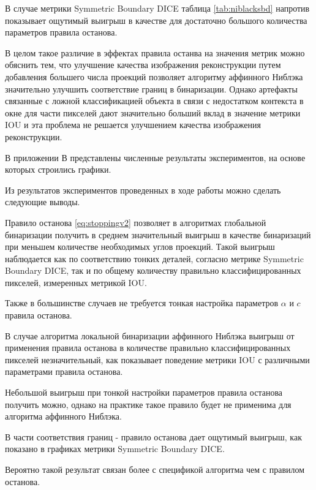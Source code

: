 В случае метрики Symmetric Boundary DICE таблица \ref*{tab:niblacksbd} напротив показывает ощутимый выигрыш в качестве для достаточно большого количества параметров правила останова.

В целом такое различие в эффектах правила останва на значения метрик можно обяснить тем, что улучшение качества изображения реконструкции путем добавления большего числа проекций позволяет алгоритму аффинного Ниблэка значительно улучшить соответствие границ в бинаризации. Однако артефакты связанные с ложной классификацией объекта в связи с недостатком контекста в окне для части пикселей дают значительно больший вклад в значение метрики IOU и эта проблема не решается улучшением качества изображения реконструкции.

В приложении В представлены численные результаты экспериментов, на основе которых строились графики.

Из результатов экспериментов проведенных в ходе работы можно сделать следующие выводы.

Правило останова \ref*{eq:stoppingv2} позволяет в алгоритмах глобальной бинаризации получить в среднем значительный выигрыш в качестве бинаризаций при меньшем количестве необходимых углов проекций. Такой выигрыш наблюдается как по соответствию тонких деталей, согласно метрике Symmetric Boundary DICE, так и по общему количеству правильно классифицированных пикселей, измеренных метрикой IOU.

Также в большинстве случаев не требуется тонкая настройка параметров \(\alpha\) и \(c\) правила останова.

В случае алгоритма локальной бинаризации аффинного Ниблэка выигрыш от применения правила останова в количестве правильно классифицированных пикселей незначительный, как показывает поведение метрики IOU с различными параметрами правила останова.

Небольшой выигрыш при тонкой настройки параметров правила останова получить можно, однако на практике такое правило будет не применима для алгоритма аффинного Ниблэка.

В части соответствия границ - правило останова дает ощутимый выигрыш, как показано в графиках метрики Symmetric Boundary DICE.

Вероятно такой результат связан более с спецификой алгоритма чем с правилом останова.